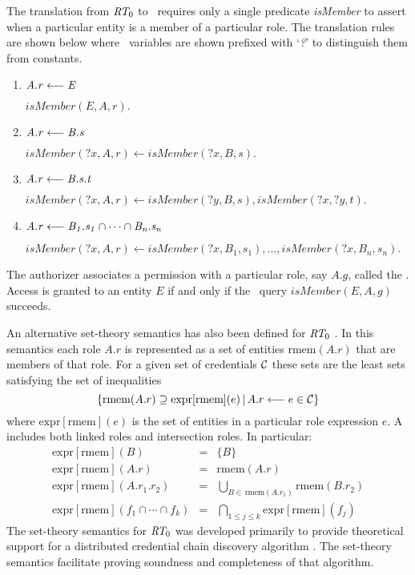 The translation from $\textit{RT}_0$ to \datalog\ requires only a single predicate \textit{isMember} to
assert when a particular entity is a member of a particular role. The translation rules are
shown below where \datalog\ variables are shown prefixed with `\textit{?}' to distinguish them
from constants.
\begin{enumerate}

\item $\mathit{A.r} \stackrel{}{\longleftarrow} \mathit{E}$

$\textit{isMember}(E, A, r).$

\item $\mathit{A.r} \stackrel{}{\longleftarrow} \mathit{B.s}$

$\textit{isMember}(\textit{?x}, A, r) \leftarrow
 \textit{isMember}(\textit{?x}, B, s).$

\item $\mathit{A.r} \stackrel{}{\longleftarrow} \mathit{B.s.t}$

$\textit{isMember}(\textit{?x}, A, r) \leftarrow
 \textit{isMember}(\textit{?y}, B, s),
 \textit{isMember}(\textit{?x}, \textit{?y}, t).$

\item $\mathit{A.r} \stackrel{}{\longleftarrow} \mathit{B_1.s_1 \cap \cdots \cap B_n.s_n}$

$\textit{isMember}(\textit{?x}, A, r) \leftarrow
 \textit{isMember}(\textit{?x}, B_1, s_1), \ldots,
 \textit{isMember}(\textit{?x}, B_n, s_n).$

\end{enumerate}
The authorizer associates a permission with a particular role, say $A.g$, called the
. Access is granted to an entity $E$ if and only if the \datalog\ query
$\textit{isMember}(E, A, g)$ succeeds.

An alternative set-theory semantics has also been defined for $\textit{RT}_0$ \cite{Li:DCDTM}. In this
semantics each role $A.r$ is represented as a set of entities $\mbox{rmem}(A.r)$ that are
members of that role. For a given set of credentials $\mathcal{C}$ these sets are the least sets
satisfying the set of inequalities
\begin{displaymath}
\{ \mbox{rmem}(A.r) \supseteq \mbox{expr}[\mbox{rmem}](e)\,|\,
   A.r \longleftarrow e \in \mathcal{C} \}
\end{displaymath}
where $\mbox{expr}[\mbox{rmem}](e)$ is the set of entities in a particular role expression $e$.
A  includes both linked roles and intersection roles. In particular:
\begin{eqnarray*}
\mbox{expr}[\mbox{rmem}](B)        & = & \{B\}            \\
\mbox{expr}[\mbox{rmem}](A.r)      & = & \mbox{rmem}(A.r) \\
\mbox{expr}[\mbox{rmem}](A.r_1.r_2) & = &
  \bigcup_{B \in\, \mbox{rmem}(A.r_1)} \mbox{rmem}(B.r_2) \\
\mbox{expr}[\mbox{rmem}](f_1 \cap \cdots \cap f_k) & = &
  \bigcap_{1 \le j \le k} \mbox{expr}[\mbox{rmem}](f_j)
\end{eqnarray*}
The set-theory semantics for $\textit{RT}_0$ was developed primarily to provide theoretical support for
a distributed credential chain discovery algorithm \cite{Li:DCDTM}. The set-theory semantics
facilitate proving soundness and completeness of that algorithm.

